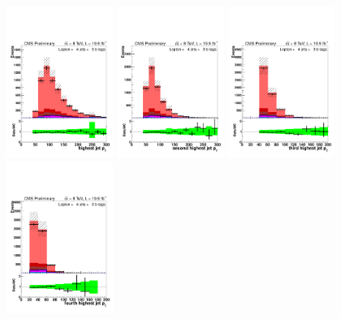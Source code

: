 \begin{figure}[hbtp]
\begin{center}
   \includegraphics[width=0.31\textwidth]{Figures/Analysis_2_Diagrams/LJ_plots_lep/4j3t/lep_jet_pt_1_4j3t_cumulative_wRatio_noLegend_lin.pdf}
   \includegraphics[width=0.31\textwidth]{Figures/Analysis_2_Diagrams/LJ_plots_lep/4j3t/lep_jet_pt_2_4j3t_cumulative_wRatio_noLegend_lin.pdf}
   \includegraphics[width=0.31\textwidth]{Figures/Analysis_2_Diagrams/LJ_plots_lep/4j3t/lep_jet_pt_3_4j3t_cumulative_wRatio_noLegend_lin.pdf}
   \includegraphics[width=0.31\textwidth]{Figures/Analysis_2_Diagrams/LJ_plots_lep/4j3t/lep_jet_pt_4_4j3t_cumulative_wRatio_noLegend_lin.pdf}

\end{center}
\end{figure}
